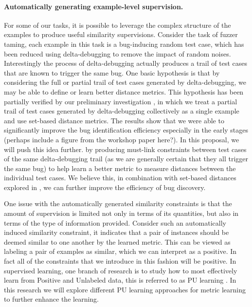 \paragraph{Automatically generating example-level supervision.} 

For some of our tasks, it is possible to leverage the complex structure of the examples to produce useful similarity supervisions. Consider the task of fuzzer taming, each example in this task is a bug-inducing random test case, which has been reduced using delta-debugging to remove the impact of random noises.  Interestingly the process of delta-debugging actually produces a trail of test cases that are known to trigger the same bug. One basic hypothesis is that by considering the full or partial trail of test cases generated by delta-debugging, we may be able to define or learn better distance metrics. This hypothesis has been partially verified by our preliminary investigation \cite{peiworkshop}, in which we treat a partial trail of test cases generated by delta-debugging collectively as a single example and use set-based distance metrics. The results show that we were able to significantly improve the bug identification efficiency especially in the early stages (perhaps include a figure from the workshop paper here?). In this proposal, we will push this idea further. by producing must-link constraints between test cases of the same delta-debugging trail (as we are generally certain that they all trigger the same bug) to help learn a better metric to measure distances between the individual test cases. We believe this, in combination with set-based distances explored in \cite{peiworkshop}, we can further improve the efficiency of bug discovery.

One issue with the automatically generated similarity constraints is that the amount of supervision is limited not only in terms of its quantities, but also in terms of the type of information provided. Consider such an automatically induced similarity constraint, it indicates that a pair of instances should be deemed similar to one another by the learned metric. This can be viewed as labeling a pair of examples as similar, which we can interpret as a positive. In fact all of the constraints that we introduce in this fashion will be positive. In supervised learning, one branch of research is to study how to most effectively learn from Positive and Unlabeled data, this is referred to as PU learning \cite{}. In this research we will explore different PU learning approaches for metric learning to further enhance the learning.

